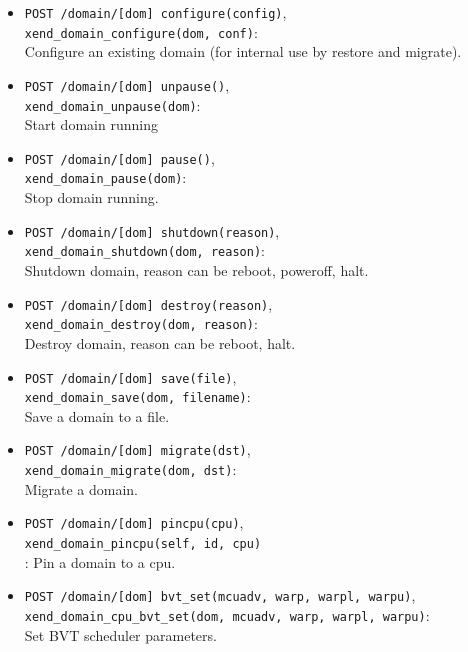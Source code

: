 \documentclass[11pt,twoside,final,openright]{xenstyle}
\begin{document}
\begin{itemize}
\item {\tt POST /domain/[dom] configure(config)},\\
  {\tt xend\_domain\_configure(dom, conf)}:\\
  Configure an existing domain (for internal use by restore and migrate).

\item {\tt POST /domain/[dom] unpause()},\\
  {\tt xend\_domain\_unpause(dom)}:\\
  Start domain running

\item {\tt POST /domain/[dom] pause()},\\
  {\tt xend\_domain\_pause(dom)}:\\
  Stop domain running.

\item {\tt POST /domain/[dom] shutdown(reason)},\\
  {\tt xend\_domain\_shutdown(dom, reason)}:\\
  Shutdown domain, reason can be reboot, poweroff, halt.

\item {\tt POST /domain/[dom] destroy(reason)},\\
  {\tt xend\_domain\_destroy(dom, reason)}:\\
  Destroy domain, reason can be reboot, halt.

\item {\tt POST /domain/[dom] save(file)},\\
  {\tt xend\_domain\_save(dom, filename)}:\\
  Save a domain to a file.

\item {\tt POST /domain/[dom] migrate(dst)},\\
  {\tt xend\_domain\_migrate(dom, dst)}:\\
  Migrate a domain.

\item {\tt POST /domain/[dom] pincpu(cpu)},\\
  {\tt xend\_domain\_pincpu(self, id, cpu)}\\:
  Pin a domain to a cpu.

\item {\tt POST /domain/[dom] bvt\_set(mcuadv, warp, warpl, warpu)},\\
  {\tt xend\_domain\_cpu\_bvt\_set(dom, mcuadv, warp, warpl, warpu)}:\\
  Set BVT scheduler parameters.


\end{itemize}
\end{document}
